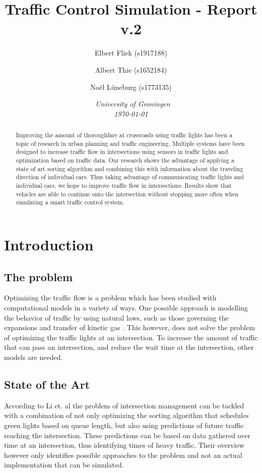 \documentclass{article}
\title{\textbf{\huge Traffic Control Simulation - Report v.2}}
\author{Elbert Fliek (s1917188) \affila \and
    Albert Thie (s1652184) \affila \and
    No\"el L\"uneburg (s1773135) \affila}
\date{\affila\ \textit{University of Groningen \\
\today}}
\begin{document}
\ttl
\thispagestyle{empty}

\begin{abstract}
    Improving the amount of thoroughfare at crossroads using traffic lights has been a topic of research in urban planning and traffic engineering. Multiple systems have been designed to increase traffic flow in intersections using sensors in traffic lights and optimization based on traffic data. Our research shows the advantage of applying a state of art sorting algorithm and combining this with information about the traveling direction of individual cars. Thus taking advantage of communicating traffic lights and individual cars, we hope to improve traffic flow in intersections. Results show that vehicles are able to continue onto the intersection without stopping more often when simulating a smart traffic control system.
\end{abstract}



\section{Introduction}
\subsection{The problem}
Optimizing the traffic flow is a problem which has been studied with computational models in a variety of ways. One possible approach is modelling the behavior of traffic by using natural laws, such as those governing the expansions and transfer of kinetic gas \cite{helbing2001master}. This however, does not solve the problem of optimizing the traffic lights at an intersection. To increase the amount of traffic that can pass an intersection, and reduce the wait time at the intersection, other models are needed.

\subsection{State of the Art}
According to Li et. al \cite{survey2014} the problem of intersection management can be tackled with a combination of not only optimizing the sorting algorithm that schedules green lights based on queue length, but also using predictions of future traffic reaching the intersection. These predictions can be based on data gathered over time at an intersection, thus identifying times of heavy traffic. Their overview however only identifies possible approaches to the problem and not an actual implementation that can be simulated.
\end{document}
